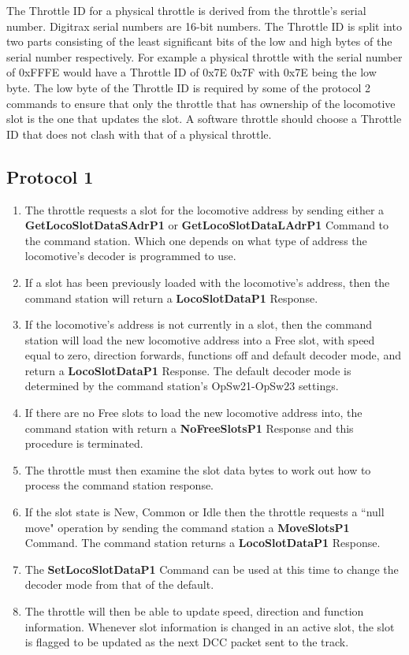 The \gls{Throttle ID} for a \gls{physical throttle} is derived from the throttle's serial number. Digitrax serial numbers are 16-bit numbers. The Throttle ID is split into two parts consisting of the least significant bits of the low and high bytes of the serial number respectively. For example a physical throttle with the serial number of 0xFFFE would have a Throttle ID of 0x7E 0x7F with 0x7E being the low byte. The low byte of the Throttle ID is required by some of the protocol 2 commands to ensure that only the throttle that has ownership of the locomotive slot is the one that updates the slot. A \gls{software throttle} should choose a Throttle ID that does not clash with that of a physical throttle.

\subsection{Protocol 1}

\begin{enumerate}
\item The throttle requests a slot for the locomotive \gls{address} by sending either a \textbf{GetLocoSlotDataSAdrP1} or \textbf{GetLocoSlotDataLAdrP1} \gls{Command} to the command station. Which one depends on what type of address the locomotive's decoder is programmed to use. 
\item If a slot has been previously loaded with the locomotive's address, then the command station will return a \textbf{LocoSlotDataP1} \gls{Response}.
\item If the locomotive's address is not currently in a slot, then the command station will load the new locomotive address into a Free slot, with speed equal to zero, direction forwards, functions off and default decoder mode, and return a \textbf{LocoSlotDataP1} \gls{Response}. The default decoder mode is determined by the command station's OpSw21-OpSw23 settings.
\item If there are no Free slots to load the new locomotive address into, the command station with return a \textbf{NoFreeSlotsP1} \gls{Response} and this procedure is terminated.
\item The throttle must then examine the slot data bytes to work out how to process the command station response.
\item If the slot state is New, Common or Idle then the throttle requests a ``null move" operation by sending the command station a \textbf{MoveSlotsP1} \gls{Command}. The command station returns a \textbf{LocoSlotDataP1} \gls{Response}. 
\item The \textbf{SetLocoSlotDataP1} \gls{Command} can be used at this time to change the decoder mode from that of the default.
\item The throttle will then be able to update speed, direction and function information. Whenever slot information is changed in an active slot, the slot is flagged to be updated as the next DCC packet sent to the track. 
\end{enumerate}


